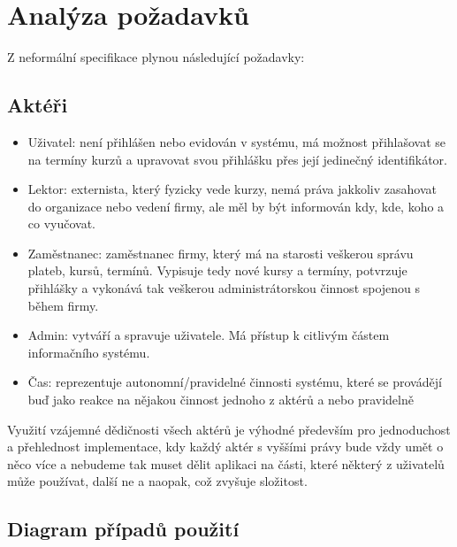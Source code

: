 \documentclass[12pt,a4paper,titlepage,final]{report}
\begin{document}
\newpage


	\section{Analýza požadavků}
	Z neformální specifikace plynou následující požadavky:
	
	\subsection{Aktéři}		
	
		\begin{itemize}
			\item Uživatel: není přihlášen nebo evidován v systému, má možnost přihlašovat se na termíny kurzů a upravovat svou přihlášku přes její jedinečný identifikátor.
			\item Lektor: externista, který fyzicky vede kurzy, nemá práva jakkoliv zasahovat do organizace nebo vedení firmy, ale měl by být informován kdy, kde, koho a co vyučovat.
			\item Zaměstnanec: zaměstnanec firmy, který má na starosti veškerou správu plateb, kursů, termínů. Vypisuje tedy nové kursy a termíny, potvrzuje přihlášky a vykonává tak veškerou administrátorskou činnost spojenou s během firmy.
			\item Admin: vytváří a spravuje uživatele. Má přístup k citlivým částem informačního systému.
			\item Čas: reprezentuje autonomní/pravidelné činnosti systému, které se provádějí buď jako reakce na nějakou činnost jednoho z aktérů a nebo pravidelně
		\end{itemize}
		
	Využití vzájemné dědičnosti všech aktérů je výhodné především pro jednoduchost a přehlednost implementace, kdy každý aktér s vyššími právy bude vždy umět o něco více a nebudeme tak muset dělit aplikaci na části, které některý z uživatelů může používat, další ne a naopak, což zvyšuje složitost.
		
		
				
	\subsection{Diagram případů použití}
	
\end{document}
